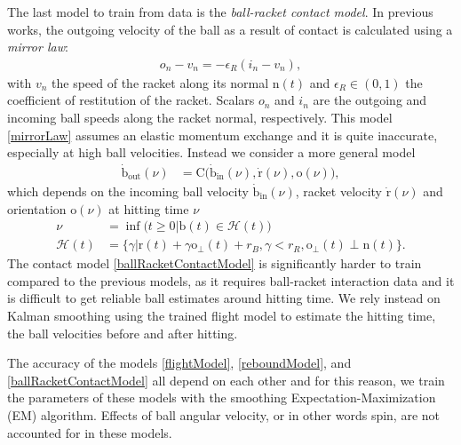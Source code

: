 \documentclass[letterpaper, 10 pt, conference]{ieeeconf}
\newcommand{\boldvec}[1]{\boldsymbol{\mathrm{#1}}}
\let\vec\boldvec
\newcommand{\ball}{\vec{b}} %
\newcommand{\ballRadius}{r_B}
\newcommand{\contact}{\vec{C}} %
\newcommand{\racket}{\vec{r}} %
\newcommand{\racketRadius}{r_R} %
\newcommand{\orient}{\vec{o}} %
\newcommand{\normal}{\vec{n}} %
\newcommand{\prob}{\mathbb{P}} %
\newcommand{\hitTime}{\nu} %
\newcommand{\hitEvent}{\mathcal{H}}
\newcommand{\hitDist}{p(\nu)} %
\begin{document}

The last model to train from data is the \emph{ball-racket contact model}. In previous works, the outgoing velocity of the ball as a result of contact is calculated using a \emph{mirror law}: 
%
\begin{align}
o_{n} - v_{n} = -\epsilon_{R} (i_{n} - v_{n}),
\label{mirrorLaw}
\end{align}
%
\noindent with $v_{n}$ the speed of the racket along its normal $\normal(t)$ and $\epsilon_{R} \in (0,1)$ the coefficient of restitution of the racket. Scalars $o_{n}$ and $i_{n}$ are the outgoing and incoming ball speeds along the racket normal, respectively. This model \eqref{mirrorLaw} assumes an elastic momentum exchange and it is quite inaccurate, especially at high ball velocities. Instead we consider a more general model
%
\begin{align}
\dot{\ball}_{\mathrm{out}}(\hitTime) &= \contact\big(\dot{\ball}_{\mathrm{in}}(\hitTime),\dot{\racket}(\hitTime),\orient(\hitTime)\big),
\label{ballRacketContactModel}
\end{align}
%
\noindent which depends on the incoming ball velocity $\dot{\ball}_{\mathrm{in}}(\hitTime)$, racket velocity $\dot{\racket}(\hitTime)$ and orientation $\orient(\hitTime)$ at hitting time $\hitTime$ 
%
\begin{align}
\hitTime \! &= \inf\big(t \geq 0 | \ball(t) \in \hitEvent(t)\big) \label{hitTime} \\
\hitEvent(t) \! &= \{\gamma | \racket(t) + \gamma \orient_{\perp}(t) + \ballRadius, \gamma < \racketRadius, \orient_{\perp}(t) \! \perp \! \normal(t)\}. \label{hitEvent}
\end{align}
%
\noindent The contact model \eqref{ballRacketContactModel} is significantly harder to train compared to the previous models, as it requires ball-racket interaction data and it is difficult to get reliable ball estimates around hitting time. We rely instead on Kalman smoothing using the trained flight model to estimate the hitting time, the ball velocities before and after hitting. 

The accuracy of the models \eqref{flightModel}, \eqref{reboundModel}, and \eqref{ballRacketContactModel} all depend on each other and for this reason, we train the parameters of these models with the smoothing Expectation-Maximization (EM) algorithm. Effects of ball angular velocity, or in other words spin, are not accounted for in these models.
\end{document}
